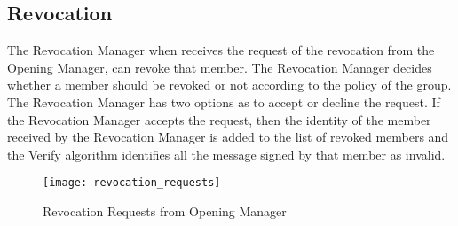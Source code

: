 \subsection{Revocation}
The Revocation Manager when receives the request of the revocation from the Opening Manager, can revoke that member. The Revocation Manager decides whether a member should be revoked or not according to the policy of the group. The Revocation Manager has two options as to accept or decline the request. If the Revocation Manager accepts the request, then the identity of the member received by the Revocation Manager is added to the list of revoked members and the Verify algorithm identifies all the message signed by that member as invalid. 
\begin{figure}[!h]
    \centering
    \texttt{[image: revocation\_requests]}
    \caption{Revocation Requests from Opening Manager}
    \label{fig:Revocation Requests from Opening Manager}
\end{figure}
